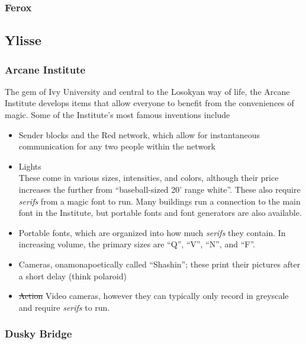 \subsubsection{Ferox}
\label{places:ferox}

\subsection{Ylisse}
\label{nations:ylisse}

\subsubsection{Arcane Institute}
\label{places:arcaneinstitute}
The gem of Ivy University and central to the Losokyan way of life, the Arcane Institute develops items that allow everyone to benefit from the conveniences of magic. Some of the Institute's most famous inventions include
\begin{itemize}
\item Sender blocks and the Red network, which allow for instantaneous communication for any two people within the network\\

\item Lights\\
These come in various sizes, intensities, and colors, although their price increases the further from ``baseball-sized 20' range white''. These also require \textit{serifs} from a magic font to run. Many buildings run a connection to the main font in the Institute, but portable fonts and font generators are also available.
\item Portable fonts, which are organized into how much \textit{serifs} they contain. In increasing volume, the primary sizes are ``Q'', ``V'', ``N'', and ``F''. 
\item Cameras, onamonapoetically called ``Shashin''; these print their pictures after a short delay (think polaroid)
\item \st{Action} Video cameras, however they can typically only record in greyscale and require \textit{serifs} to run.
\end{itemize}

\subsubsection{Dusky Bridge}
\label{places:duskybridge}


